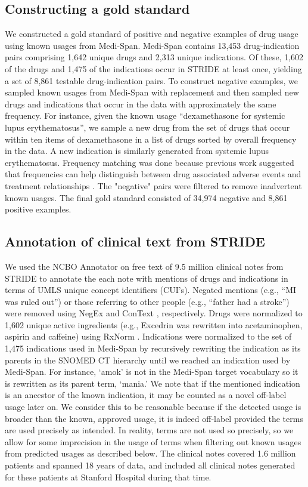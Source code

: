 \subsection{Constructing a gold standard}
We constructed a gold standard of positive and negative examples of
drug usage using known usages from Medi-Span. Medi-Span contains
13,453 drug-indication pairs comprising 1,642 unique drugs and 2,313
unique indications.  Of these, 1,602 of the drugs and 1,475 of the
indications occur in STRIDE at least once, yielding a set of 8,861
testable drug-indication pairs.  To construct negative examples, we
sampled known usages from Medi-Span with replacement and then sampled
new drugs and indications that occur in the data with approximately
the same frequency.  For instance, given the known usage
“dexamethasone for systemic lupus erythematosus”, we sample a new drug
from the set of drugs that occur within ten items of dexamethasone in
a list of drugs sorted by overall frequency in the data.  A new
indication is similarly generated from systemic lupus erythematosus.
Frequency matching was done because previous work suggested that
frequencies can help distinguish between drug associated adverse
events and treatment relationships \cite{Liu2012}.  The "negative"
pairs were filtered to remove inadvertent known usages.  The final
gold standard consisted of 34,974 negative and 8,861 positive
examples.

\subsection{Annotation of clinical text from STRIDE}
We used the NCBO Annotator on free text of 9.5 million clinical notes
from STRIDE to annotate the each note with mentions of drugs and
indications in terms of UMLS \cite{Bodenreider2004} unique concept
identifiers (CUI's).  Negated mentions (e.g., “MI was ruled out”) or
those referring to other people (e.g., “father had a stroke”) were
removed using NegEx \cite{Chapman2001} and ConText \cite{Chapman2007},
respectively.  Drugs were normalized to 1,602 unique active
ingredients (e.g., Excedrin was rewritten into acetaminophen, aspirin
and caffeine) using RxNorm \cite{Nelson2011}.  Indications were
normalized to the set of 1,475 indications used in Medi-Span by
recursively rewriting the indication as its parents in the SNOMED CT
hierarchy until we reached an indication used by Medi-Span.  For
instance, ‘amok’ is not in the Medi-Span target vocabulary so it is
rewritten as its parent term, ‘mania.’ We note that if the mentioned
indication is an ancestor of the known indication, it may be counted
as a novel off-label usage later on.  We consider this to be
reasonable because if the detected usage is broader than the known,
approved usage, it is indeed off-label provided the terms are used
precisely as intended.  In reality, terms are not used so precisely,
so we allow for some imprecision in the usage of terms when filtering
out known usages from predicted usages as described below.  The
clinical notes covered 1.6 million patients and spanned 18 years of
data, and included all clinical notes generated for these patients at
Stanford Hospital during that time.

